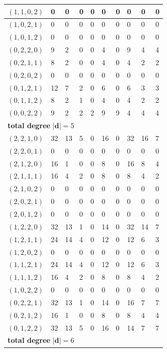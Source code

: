 \documentclass{article}
\newcommand{\bd}{\mathbf{d}}
\begin{document}
\begin{longtable}{|l|l|l|l|l|l|l|l|l|l|}
$(1,1,0,2)$ & 0 & 0 & 0 & 0 & 0 & 0 & 0 & 0 & 0 \\ \hline
$(1,0,2,1)$ & 0 & 0 & 0 & 0 & 0 & 0 & 0 & 0 & 0 \\ \hline
$(1,0,1,2)$ & 0 & 0 & 0 & 0 & 0 & 0 & 0 & 0 & 0 \\ \hline
$(0,2,2,0)$ & 9 & 2 & 0 & 0 & 4 & 0 & 9 & 4 & 4 \\ \hline
$(0,2,1,1)$ & 8 & 2 & 0 & 0 & 4 & 0 & 4 & 2 & 2 \\ \hline
$(0,2,0,2)$ & 0 & 0 & 0 & 0 & 0 & 0 & 0 & 0 & 0 \\ \hline
$(0,1,2,1)$ & 12 & 7 & 2 & 0 & 6 & 0 & 6 & 3 & 3 \\ \hline
$(0,1,1,2)$ & 8 & 2 & 1 & 0 & 4 & 0 & 4 & 2 & 2 \\ \hline
$(0,0,2,2)$ & 9 & 2 & 2 & 2 & 9 & 9 & 4 & 4 & 4 \\ \hline
\multicolumn{10}{|l|}{\textbf{total degree }$|\bd|=5$} \\ \hline
$(2,2,1,0)$ & 32 & 13 & 5 & 0 & 16 & 0 & 32 & 16 & 7 \\ \hline
$(2,2,0,1)$ & 0 & 0 & 0 & 0 & 0 & 0 & 0 & 0 & 0 \\ \hline
$(2,1,2,0)$ & 16 & 1 & 0 & 0 & 8 & 0 & 16 & 8 & 4 \\ \hline
$(2,1,1,1)$ & 16 & 4 & 2 & 0 & 8 & 0 & 8 & 4 & 2 \\ \hline
$(2,1,0,2)$ & 0 & 0 & 0 & 0 & 0 & 0 & 0 & 0 & 0 \\ \hline
$(2,0,2,1)$ & 0 & 0 & 0 & 0 & 0 & 0 & 0 & 0 & 0 \\ \hline
$(2,0,1,2)$ & 0 & 0 & 0 & 0 & 0 & 0 & 0 & 0 & 0 \\ \hline
$(1,2,2,0)$ & 32 & 13 & 1 & 0 & 14 & 0 & 32 & 14 & 7 \\ \hline
$(1,2,1,1)$ & 24 & 14 & 4 & 0 & 12 & 0 & 12 & 6 & 3 \\ \hline
$(1,2,0,2)$ & 0 & 0 & 0 & 0 & 0 & 0 & 0 & 0 & 0 \\ \hline
$(1,1,2,1)$ & 24 & 14 & 4 & 0 & 12 & 0 & 12 & 6 & 3 \\ \hline
$(1,1,1,2)$ & 16 & 4 & 2 & 0 & 8 & 0 & 8 & 4 & 2 \\ \hline
$(1,0,2,2)$ & 0 & 0 & 0 & 0 & 0 & 0 & 0 & 0 & 0 \\ \hline
$(0,2,2,1)$ & 32 & 13 & 1 & 0 & 14 & 0 & 16 & 7 & 7 \\ \hline
$(0,2,1,2)$ & 16 & 1 & 0 & 0 & 8 & 0 & 8 & 4 & 4 \\ \hline
$(0,1,2,2)$ & 32 & 13 & 5 & 0 & 16 & 0 & 14 & 7 & 7 \\ \hline
\multicolumn{10}{|l|}{\textbf{total degree }$|\bd|=6$} \\ \hline

\end{longtable}
\end{document}
